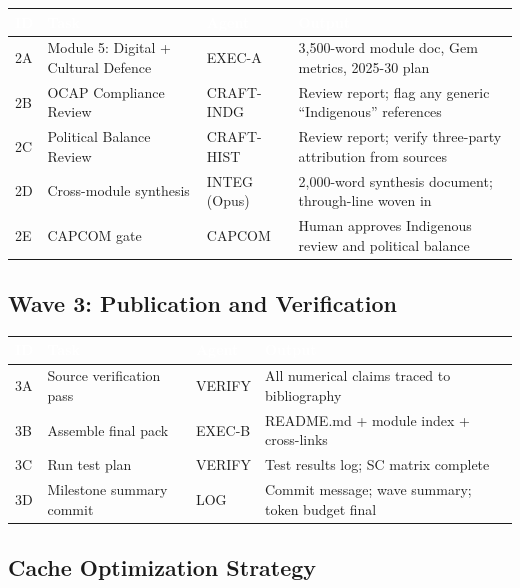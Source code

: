 \documentclass[11pt,letterpaper]{article}
\newcommand{\tableheader}[1]{\textbf{\sffamily\textcolor{white}{#1}}}
\begin{document}
\begin{center}
\begin{tabularx}{\textwidth}{C{0.7cm}L{3.5cm}C{1.5cm}X}
\toprule
{}
\tableheader{ID} & \tableheader{Task} & \tableheader{Agent} & \tableheader{Output} \\
\midrule
2A & Module 5: Digital + Cultural Defence & EXEC-A & 3,500-word module doc, Gem metrics, 2025-30 plan \\
2B & OCAP Compliance Review & CRAFT-INDG & Review report; flag any generic ``Indigenous'' references \\
2C & Political Balance Review & CRAFT-HIST & Review report; verify three-party attribution from sources \\
2D & Cross-module synthesis & INTEG (Opus) & 2,000-word synthesis document; through-line woven in \\
2E & CAPCOM gate & CAPCOM & Human approves Indigenous review and political balance \\
\bottomrule
\end{tabularx}
\end{center}

\subsection{Wave 3: Publication and Verification}

\begin{center}
\begin{tabularx}{\textwidth}{C{0.7cm}L{3.5cm}C{1.5cm}X}
\toprule
{}
\tableheader{ID} & \tableheader{Task} & \tableheader{Agent} & \tableheader{Output} \\
\midrule
3A & Source verification pass & VERIFY & All numerical claims traced to bibliography \\
3B & Assemble final pack & EXEC-B & README.md + module index + cross-links \\
3C & Run test plan & VERIFY & Test results log; SC matrix complete \\
3D & Milestone summary commit & LOG & Commit message; wave summary; token budget final \\
\bottomrule
\end{tabularx}
\end{center}

\subsection{Cache Optimization Strategy}
\end{document}
